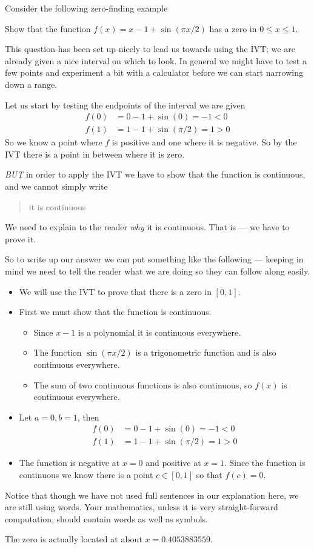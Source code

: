Consider the following zero-finding example
\begin{eg}\label{eg pre bisection}
Show that the function $f(x) = x-1+\sin(\pi x/2)$ has a zero
in $0 \leq x \leq 1$.

This question has been set up nicely to lead us towards using the IVT;  we are
already given a nice interval on which to look. In general we might have to
test a few points and experiment a bit with a calculator before we can
start narrowing down a range.

Let us start by testing the endpoints of the interval we are given
\begin{align*}
  f(0) &= 0 - 1 + \sin(0) = -1 < 0 \\
  f(1) &= 1-1+\sin(\pi/2) = 1 > 0
\end{align*}
So we know a point where $f$ is positive and one where it is negative. So by
the IVT there is a point in between where it is zero.

\emph{BUT} in order to apply the IVT we have to show that the function is
continuous, and we cannot simply write
\begin{quote}
 it is continuous
\end{quote}
We need to explain to the reader \emph{why} it is continuous. That is --- we
have to prove it.

So to write up our answer we can put something like the following ---
keeping in mind we need to tell the reader what we are doing so they can follow
along easily.
\begin{itemize}
\item We will use the IVT to prove that there is a zero in $[0,1]$.
\item First we must show that the function is continuous.
\begin{itemize}
\item Since $x-1$ is a polynomial it is continuous everywhere.
\item The function $\sin(\pi x/2)$ is a trigonometric function and is also
continuous everywhere.
\item The sum of two continuous functions is also continuous, so $f(x)$ is
continuous everywhere.
\end{itemize}
\item Let $a=0, b=1$, then
\begin{align*}
  f(0) &= 0 - 1 + \sin(0) = -1 < 0 \\
  f(1) &= 1-1+\sin(\pi/2) = 1 > 0
\end{align*}
\item The function is negative at $x=0$ and positive at $x=1$. Since the
function is continuous we know there is a point $c \in [0,1]$ so that $f(c) =
0$.
 \end{itemize}
Notice that though we have not used full sentences in our explanation here, we
are still using words. Your mathematics, unless it is very straight-forward
computation, should contain words as well as symbols.
\end{eg}
The zero is actually located at about $x=0.4053883559$.

